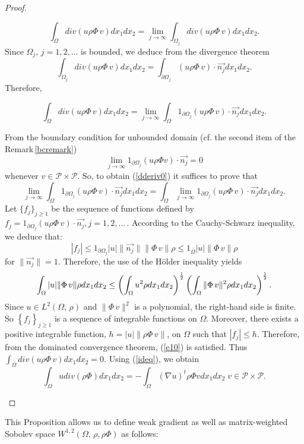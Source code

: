 \documentclass[11pt]{article}
\begin{document}
\begin{proof}
\begin{itemize}
		$$\int_{\Omega}div(u\rho\Phi\,v)dx_1dx_2=\lim_{j \to \infty }\int_{\Omega_j}div(u\rho\Phi\,v)dx_1dx_2.$$ Since  $\Omega_j,\,j=1,2,.. .$ is bounded, we deduce from the divergence theorem $$\int_{\Omega_j}div(u\rho\Phi\,v)dx_1dx_2=\int_{\partial\Omega_j}\left(u\rho\Phi\,v\right)\cdot\overrightarrow{n_j}dx_1dx_2.$$ Therefore, 
		
		$$\int_{\Omega}div(u\rho\Phi\,v)dx_1dx_2=\lim_{j \to \infty }\int_{{\Omega}} 1_{\partial\Omega_j}\left(u\rho\Phi\,v\right)\cdot\overrightarrow{n_j}dx_1dx_2.$$
		
		 From the boundary condition for unbounded domain (cf. the second item of the Remark\,\ref{bcremark}) $$\displaystyle{\lim_{j \to \infty}1_{\partial\Omega_j}\left(u\rho\Phi v\right)\cdot\overrightarrow{n_j}}=0$$ whenever $v\in \mathcal{P}\times \mathcal{P}$. So, to obtain (\ref{dderiv0}) it suffices to prove that  
		\begin{equation}\label{e10}
			\lim_{j \to \infty }\int_{{\Omega}} 1_{\partial\Omega_j}\left(u\rho\Phi\,v\right)\cdot\overrightarrow{n_j}dx_1dx_2=\int_{{\Omega}}  \lim_{j \to \infty } 1_{\partial\Omega_j}\left(u\rho\Phi\,v\right)\cdot\overrightarrow{n_j}dx_1dx_2.
		\end{equation} 
		Let  $\{f_j\}_{j\geq 1}$ {be the sequence of functions defined by} 
		$f_j=1_{\partial\Omega_j}\left(u\rho\Phi\,v\right)\cdot\overrightarrow{n_j},j=1,2,...\, .$ According to the Cauchy-Schwarz inequality, we deduce that:  $$|f_j|\leq 1_{\partial\Omega_j} |u|\|\overrightarrow{n_j}\|\|\Phi\,v\|\rho\leq 1_{\overline{\Omega}}|u|\|\Phi\,v\|\rho$$ for $\|\overrightarrow{n_j}\|=1$. Therefore, the use  of the {H\"older} inequality yields   
		$$\int_{\Omega}|u|\|\Phi\,v\|\rho dx_1dx_2\leq \left(\int_{\Omega}u^2\rho dx_1dx_2\right)^{1\over 2}\left(\int_{\Omega}\|\Phi\,v\|^2\rho dx_1dx_2\right)^{1\over 2}.$$ Since $u\in L^2(\Omega,\, \rho)$ and $\|\Phi\,v\|^2$ is a polynomial, the right-hand side is finite. So $\left\{f_j\right\}_{j\geq 1}$ is a sequence of integrable functions on $\Omega$. Moreover, there exists a positive integrable function, $h=|u|\|\rho\Phi\,v\|$, on $\Omega$ such that $|f_j|\leq h$. Therefore, from the dominated convergence theorem, (\ref{e10}) is satisfied. Thus $\int_{\Omega}div(u\rho\Phi\,v)dx_1dx_2=0.$ Using (\ref{ideq}), we obtain $$\int_{\Omega}udiv\left(\rho\Phi\right)dx_1dx_2=-\int_{\Omega}\left(\nabla u\right)^t\rho\Phi vdx_1dx_2\; v\in \mathcal{P}\times \mathcal{P}.$$
	\end{itemize}
	\end{proof}
	This Proposition allows us to define weak gradient as well as matrix-weighted Sobolev space $W^{1,2}(\Omega,\, \rho,\rho\Phi)$ {as follows:}
	
\end{document}
